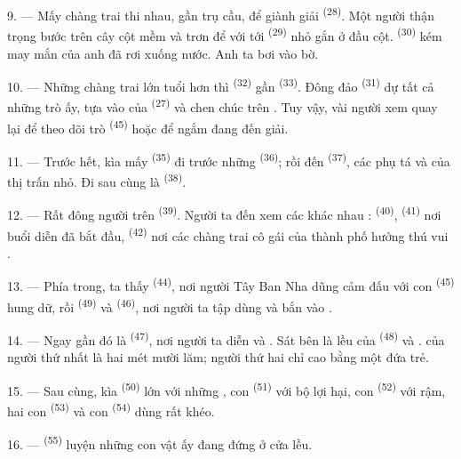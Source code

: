 9. --- Mấy chàng trai thi nhau, gần trụ cầu, để giành giải 
\textsuperscript{(28)}. Một người thận trọng bước trên cây cột mềm và trơn để với tới
 \textsuperscript{(29)} nhỏ gắn ở đầu cột. 
\textsuperscript{(30)} kém may mắn của anh đã rơi xuống nước. Anh ta bơi vào bờ.

10. --- Những chàng trai lớn tuổi hơn thì  \textsuperscript{(32)} gần
 \textsuperscript{(33)}. Đông đảo  \textsuperscript{(31)}
dự tất cả những trò ấy, tựa vào  của 
\textsuperscript{(27)} và chen chúc trên . Tuy vậy, vài người xem quay lại để
theo dõi trò  \textsuperscript{(45)} hoặc để ngắm  đang đến  giải.

11. --- Trước hết, kìa mấy  \textsuperscript{(35)} đi trước những
 \textsuperscript{(36)}; rồi đến 
\textsuperscript{(37)}, các phụ tá và  của thị trấn nhỏ. Đi
sau cùng là  \textsuperscript{(38)}.

\VUsaut{5.0mm}
\VUsaut{3.6mm}

12. --- Rất đông người trên  \textsuperscript{(39)}. Người ta đến
xem các  khác nhau :  \textsuperscript{(40)},
 \textsuperscript{(41)} nơi buổi diễn đã bắt đầu,  \textsuperscript{(42)} nơi các chàng trai cô gái của thành phố hưởng thú vui
.

13. --- Phía trong, ta thấy  \textsuperscript{(44)}, nơi người
 Tây Ban Nha dũng cảm đấu với con 
\textsuperscript{(45)} hung dữ, rồi  \textsuperscript{(49)} và
 \textsuperscript{(46)}, nơi người ta tập dùng  và bắn
vào .

14. --- Ngay gần đó là  \textsuperscript{(47)}, nơi người ta
diễn  và . Sát bên là lều của 
\textsuperscript{(48)} và .  của người thứ nhất là
hai mét mười lăm; người thứ hai chỉ cao bằng một đứa trẻ.

15. --- Sau cùng, kìa  \textsuperscript{(50)} lớn với những
, con  \textsuperscript{(51)} với bộ  lợi
hại, con  \textsuperscript{(52)} với  rậm, hai con
 \textsuperscript{(53)} và con  \textsuperscript{(54)}
dùng  rất khéo.

16. ---  \textsuperscript{(55)} luyện những con vật ấy đang đứng ở
cửa lều.
\VUsaut{6.0mm}
\VUfilet{22mm}
